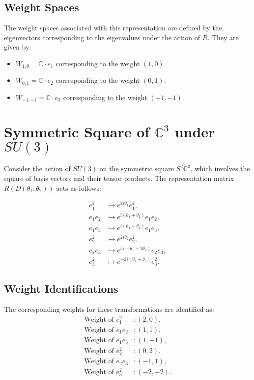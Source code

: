 \documentclass{article}
\begin{document}
\subsection*{Weight Spaces}

The weight spaces associated with this representation are defined by the eigenvectors corresponding to the eigenvalues under the action of \( R \). They are given by:
\begin{itemize}
\item \( W_{1,0} = \mathbb{C} \cdot e_1 \) corresponding to the weight \( (1,0) \).
\item \( W_{0,1} = \mathbb{C} \cdot e_2 \) corresponding to the weight \( (0,1) \).
\item \( W_{-1,-1} = \mathbb{C} \cdot e_3 \) corresponding to the weight \( (-1,-1) \).
\end{itemize}

\section*{Symmetric Square of \( \mathbb{C}^3 \) under \( SU(3) \)}

Consider the action of \( SU(3) \) on the symmetric square \( S^2 \mathbb{C}^3 \), which involves the square of basis vectors and their tensor products. The representation matrix \( R(D(\theta_1, \theta_2)) \) acts as follows:

\begin{align*}
e_1^2 & \mapsto e^{2i\theta_1} e_1^2, \\
e_1 e_2 & \mapsto e^{i(\theta_1 + \theta_2)} e_1 e_2, \\
e_1 e_3 & \mapsto e^{i(\theta_1 - \theta_2)} e_1 e_3, \\
e_2^2 & \mapsto e^{2i\theta_2} e_2^2, \\
e_2 e_3 & \mapsto e^{i(-\theta_1 + 2\theta_2)} e_2 e_3, \\
e_3^2 & \mapsto e^{-2i(\theta_1 + \theta_2)} e_3^2.
\end{align*}

\subsection*{Weight Identifications}

The corresponding weights for these transformations are identified as:
\begin{align*}
\text{Weight of } e_1^2 & : (2, 0), \\
\text{Weight of } e_1 e_2 & : (1, 1), \\
\text{Weight of } e_1 e_3 & : (1, -1), \\
\text{Weight of } e_2^2 & : (0, 2), \\
\text{Weight of } e_2 e_3 & : (-1, 1), \\
\text{Weight of } e_3^2 & : (-2, -2).
\end{align*}
\end{document}
